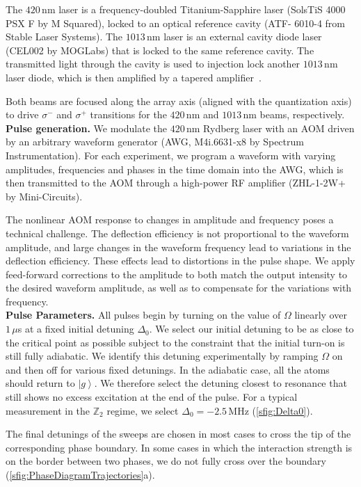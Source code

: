 \documentclass[prl,nobalancelastpage,superscriptaddress,twocolumn,nofootinbib]{revtex4}
\newcommand{\pargap}{\\[12pt]}
\newcommand{\ket}[1]{\left|#1\right\rangle}
\begin{document}
The $420\,$nm laser is a frequency-doubled Titanium-Sapphire laser (SolsTiS 4000 PSX F by M Squared), locked to an optical reference cavity (ATF-
6010-4 from Stable Laser Systems). The $1013\,$nm laser is an external cavity diode laser (CEL002 by MOGLabs) that is locked to the same reference cavity. The transmitted light through the cavity is used to injection lock another $1013\,$nm laser diode, which is then amplified by a tapered amplifier~\cite{Levine2018}. 

Both beams are focused along the array axis (aligned with the quantization axis) to drive $\sigma^-$ and $\sigma^+$ transitions for the $420\,$nm and $1013\,$nm beams, respectively.\pargap
\noindent\textbf{Pulse generation.} We modulate the $420\,$nm Rydberg laser with an AOM driven by an arbitrary waveform generator (AWG, M4i.6631-x8 by Spectrum Instrumentation). For each experiment, we program a waveform with varying amplitudes, frequencies and phases in the time domain into the AWG, which is then transmitted to the AOM through a high-power RF amplifier (ZHL-1-2W+ by Mini-Circuits).

The nonlinear AOM response to changes in amplitude and frequency poses a technical challenge. The deflection efficiency is not proportional to the waveform amplitude, and large changes in the waveform frequency lead to variations in the deflection efficiency. These effects lead to distortions in the pulse shape.  
We apply feed-forward corrections to the amplitude to both match the output intensity to the desired waveform amplitude, as well as to compensate for the variations with frequency.
\pargap
\noindent\textbf{Pulse Parameters.} All pulses begin by turning on the value of $\Omega$ linearly over $1\,\mu$s at a fixed initial detuning $\Delta_{0}$. We select our initial detuning to be as close to the critical point as possible subject to the constraint that the initial turn-on is still fully adiabatic. We identify this detuning experimentally by ramping $\Omega$ on and then off for various fixed detunings. In the adiabatic case, all the atoms should return to $\ket{g}$. We therefore select the detuning closest to resonance that still shows no excess excitation at the end of the pulse. For a typical measurement in the $\mathbb{Z}_2$ regime, we select $\Delta_0 = -2.5\,$MHz (\ref{sfig:Delta0}).

The final detunings of the sweeps are chosen in most cases to cross the tip of the corresponding phase boundary. In some cases in which the interaction strength is on the border between two phases, we do not fully cross over the boundary (\ref{sfig:PhaseDiagramTrajectories}a).
\end{document}
